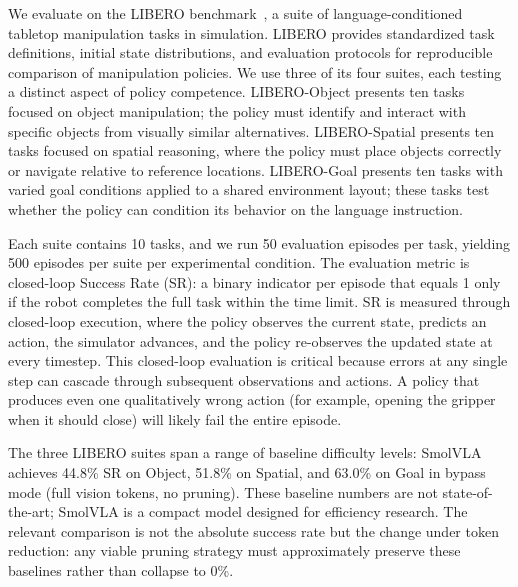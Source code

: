 We evaluate on the LIBERO benchmark~\cite{liu2023libero}, a suite of language-conditioned tabletop manipulation tasks in simulation.
LIBERO provides standardized task definitions, initial state distributions, and evaluation protocols for reproducible comparison of manipulation policies.
We use three of its four suites, each testing a distinct aspect of policy competence.
LIBERO-Object presents ten tasks focused on object manipulation; the policy must identify and interact with specific objects from visually similar alternatives.
LIBERO-Spatial presents ten tasks focused on spatial reasoning, where the policy must place objects correctly or navigate relative to reference locations.
LIBERO-Goal presents ten tasks with varied goal conditions applied to a shared environment layout; these tasks test whether the policy can condition its behavior on the language instruction.

Each suite contains 10 tasks, and we run 50 evaluation episodes per task, yielding 500 episodes per suite per experimental condition.
The evaluation metric is closed-loop Success Rate (SR): a binary indicator per episode that equals 1 only if the robot completes the full task within the time limit.
SR is measured through closed-loop execution, where the policy observes the current state, predicts an action, the simulator advances, and the policy re-observes the updated state at every timestep.
This closed-loop evaluation is critical because errors at any single step can cascade through subsequent observations and actions.
A policy that produces even one qualitatively wrong action (for example, opening the gripper when it should close) will likely fail the entire episode.

The three LIBERO suites span a range of baseline difficulty levels: SmolVLA achieves 44.8\% SR on Object, 51.8\% on Spatial, and 63.0\% on Goal in bypass mode (full vision tokens, no pruning).
These baseline numbers are not state-of-the-art; SmolVLA is a compact model designed for efficiency research.
The relevant comparison is not the absolute success rate but the change under token reduction: any viable pruning strategy must approximately preserve these baselines rather than collapse to 0\%.